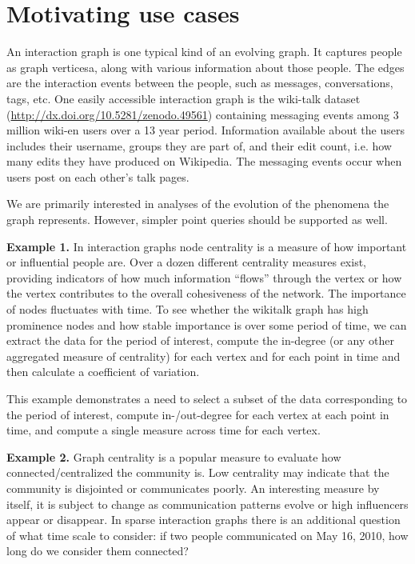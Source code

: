 \section{Motivating use cases}
\label{sec:cases}

An interaction graph is one typical kind of an evolving graph.  It
captures people as graph verticesa, along with various information
about those people.  The edges are the interaction events between the
people, such as messages, conversations, tags, etc.  One easily
accessible interaction graph is the wiki-talk dataset
(\url{http://dx.doi.org/10.5281/zenodo.49561}) containing messaging
events among 3 million wiki-en users over a 13 year period.
Information available about the users includes their username, groups
they are part of, and their edit count, i.e. how many edits they have
produced on Wikipedia.  The messaging events occur when users post on
each other's talk pages.

We are primarily interested in analyses of the evolution of the
phenomena the graph represents.  However, simpler point queries should
be supported as well.

{\bf Example 1.}  In interaction graphs node centrality is a measure
of how important or influential people are.  Over a dozen different
centrality measures exist, providing indicators of how much
information ``flows'' through the vertex or how the vertex contributes
to the overall cohesiveness of the network.  The importance of nodes
fluctuates with time.  To see whether the wikitalk graph has high
prominence nodes and how stable importance is over some period of
time, we can extract the data for the period of interest, compute the
in-degree (or any other aggregated measure of centrality) for each
vertex and for each point in time and then calculate a coefficient of
variation.

This example demonstrates a need to select a subset of the data
corresponding to the period of interest, compute in-/out-degree for
each vertex at each point in time, and compute a single measure across
time for each vertex.

{\bf Example 2.}  Graph centrality is a popular measure to evaluate
how connected/centralized the community is.  Low centrality may
indicate that the community is disjointed or communicates poorly.  An
interesting measure by itself, it is subject to change as
communication patterns evolve or high influencers appear or disappear.
In sparse interaction graphs there is an additional question of what
time scale to consider: if two people communicated on May 16, 2010,
how long do we consider them connected?


